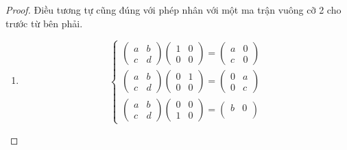 \begin{proof}
    Điều tương tự cũng đúng với phép nhân với một ma trận vuông cỡ 2 cho trước từ bên phải.
    \begin{enumerate}[label = (\alph*)]
        \item
              \[
                  \begin{cases}
                      \begin{pmatrix}
                          a & b \\
                          c & d
                      \end{pmatrix}
                      \begin{pmatrix}
                          1 & 0 \\
                          0 & 0
                      \end{pmatrix}=
                      \begin{pmatrix}
                          a & 0 \\
                          c & 0
                      \end{pmatrix} \\
                      \begin{pmatrix}
                          a & b \\
                          c & d
                      \end{pmatrix}
                      \begin{pmatrix}
                          0 & 1 \\
                          0 & 0
                      \end{pmatrix}=
                      \begin{pmatrix}
                          0 & a \\
                          0 & c
                      \end{pmatrix} \\
                      \begin{pmatrix}
                          a & b \\
                          c & d
                      \end{pmatrix}
                      \begin{pmatrix}
                          0 & 0 \\
                          1 & 0
                      \end{pmatrix}=
                      \begin{pmatrix}
                          b & 0 \\

\end{pmatrix}
\end{cases}\]
\end{enumerate}
\end{proof}
